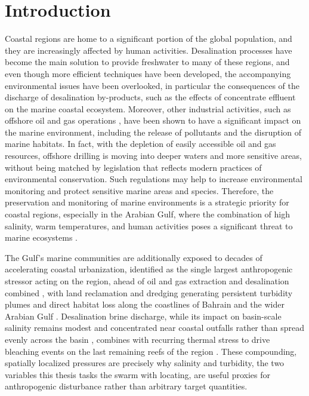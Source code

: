 \chapter{Introduction}

Coastal regions are home to a significant portion of the global population,
and they are increasingly affected by human activities. Desalination processes \cite{omerspahic2022brine} have
become the main solution to provide freshwater to many of these regions, and even though
more efficient techniques have been developed, the accompanying environmental issues have 
been overlooked, in particular the consequences of the discharge of desalination 
by-products, such as the effects of concentrate effluent on the marine coastal ecosystem. 
Moreover, other industrial activities, such as offshore oil and gas operations \cite{cordes2016oilgas}, 
have been shown to have a significant impact on the marine environment, including the
release of pollutants and the disruption of marine habitats. In fact, with the depletion of easily accessible
oil and gas resources, offshore drilling is moving into deeper waters and more sensitive areas,
without being matched by legislation that reflects modern practices of environmental conservation. 
Such regulations may help to increase environmental monitoring and protect sensitive marine areas and species. 
Therefore, the preservation and monitoring of marine environments is a strategic priority for coastal regions, 
especially in the Arabian Gulf, where the combination of high salinity, warm temperatures, and human activities 
poses a significant threat to marine ecosystems \cite{sheppard2010gulf}.

The Gulf's marine communities are additionally exposed to decades of accelerating coastal urbanization, identified as the single largest anthropogenic stressor acting on the region, ahead of oil and gas extraction and desalination combined \cite{sale2011gulf}, with land reclamation and dredging generating persistent turbidity plumes and direct habitat loss along the coastlines of Bahrain \cite{zainal2012reclamation} and the wider Arabian Gulf \cite{burt2014urbanization}. Desalination brine discharge, while its impact on basin-scale salinity remains modest and concentrated near coastal outfalls rather than spread evenly across the basin \cite{paparella2022salinity}, combines with recurring thermal stress to drive bleaching events on the last remaining reefs of the region \cite{hadjhammou2025bleaching}. These compounding, spatially localized pressures are precisely why salinity and turbidity, the two variables this thesis tasks the swarm with locating, are useful proxies for anthropogenic disturbance rather than arbitrary target quantities.


